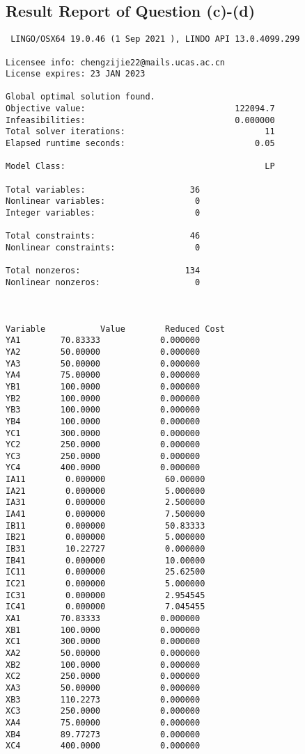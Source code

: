 \documentclass[12pt]{article}
\begin{document}
\begin{appendices}
\subsection{Result Report of Question (c)-(d)}
\begin{lstlisting}
 LINGO/OSX64 19.0.46 (1 Sep 2021 ), LINDO API 13.0.4099.299

Licensee info: chengzijie22@mails.ucas.ac.cn  
License expires: 23 JAN 2023

Global optimal solution found.
Objective value:                              122094.7
Infeasibilities:                              0.000000
Total solver iterations:                            11
Elapsed runtime seconds:                          0.05

Model Class:                                        LP

Total variables:                     36
Nonlinear variables:                  0
Integer variables:                    0

Total constraints:                   46
Nonlinear constraints:                0

Total nonzeros:                     134
Nonlinear nonzeros:                   0



Variable           Value        Reduced Cost
YA1        70.83333            0.000000
YA2        50.00000            0.000000
YA3        50.00000            0.000000
YA4        75.00000            0.000000
YB1        100.0000            0.000000
YB2        100.0000            0.000000
YB3        100.0000            0.000000
YB4        100.0000            0.000000
YC1        300.0000            0.000000
YC2        250.0000            0.000000
YC3        250.0000            0.000000
YC4        400.0000            0.000000
IA11        0.000000            60.00000
IA21        0.000000            5.000000
IA31        0.000000            2.500000
IA41        0.000000            7.500000
IB11        0.000000            50.83333
IB21        0.000000            5.000000
IB31        10.22727            0.000000
IB41        0.000000            10.00000
IC11        0.000000            25.62500
IC21        0.000000            5.000000
IC31        0.000000            2.954545
IC41        0.000000            7.045455
XA1        70.83333            0.000000
XB1        100.0000            0.000000
XC1        300.0000            0.000000
XA2        50.00000            0.000000
XB2        100.0000            0.000000
XC2        250.0000            0.000000
XA3        50.00000            0.000000
XB3        110.2273            0.000000
XC3        250.0000            0.000000
XA4        75.00000            0.000000
XB4        89.77273            0.000000
XC4        400.0000            0.000000


\end{lstlisting}
\end{appendices}
\end{document}

